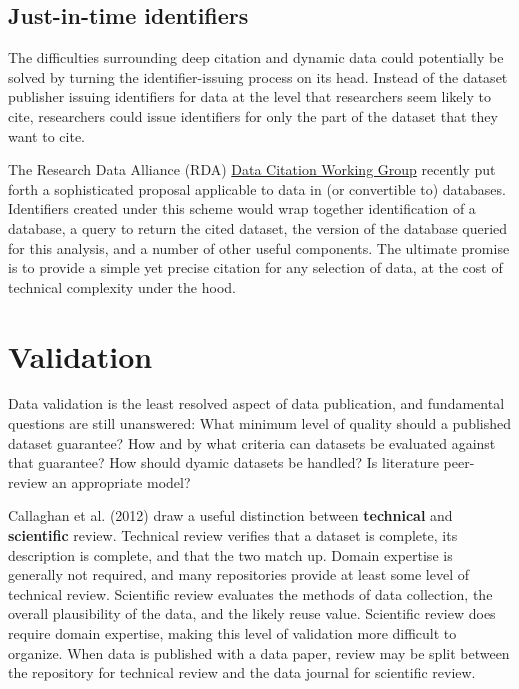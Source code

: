 \documentclass[10pt,a4paper,twocolumn]{article}
\begin{document}
{\subsection*{Just-in-time identifiers}\label{just-in-time-identifiers}

The difficulties surrounding deep citation and dynamic data could potentially be solved by turning the identifier-issuing process on its head.
Instead of the dataset publisher issuing identifiers for data at the level that researchers seem likely to cite, researchers could issue identifiers for only the part of the dataset that they want to cite.

The Research Data Alliance (RDA) \href{http://rd-alliance.org/working-groups/data-citation-wg.html}{Data Citation Working Group} recently put forth a sophisticated proposal applicable to data in (or convertible to) databases.
Identifiers created under this scheme would wrap together identification of a database, a query to return the cited dataset, the version of the database queried for this analysis, and a number of other useful components.
The ultimate promise is to provide a simple yet precise citation for any selection of data, at the cost of technical complexity under the hood.

\section*{Validation}\label{validation}

Data validation is the least resolved aspect of data publication, and fundamental questions are still unanswered:
What minimum level of quality should a published dataset guarantee?
How and by what criteria can datasets be evaluated against that guarantee?
How should dyamic datasets be handled?
Is literature peer-review an appropriate model?

Callaghan et al. (2012)\cite{sarah_callaghan_making_2012} draw a useful distinction between \textbf{technical} and \textbf{scientific} review.
Technical review verifies that a dataset is complete, its description is complete, and that the two match up.
Domain expertise is generally not required, and many repositories provide at least some level of technical review.
Scientific review evaluates the methods of data collection, the overall plausibility of the data, and the likely reuse value.
Scientific review does require domain expertise, making this level of validation more difficult to organize\cite{doorn_lies_2013}.
When data is published with a data paper, review may be split between the repository for technical review and the data journal for scientific review.

}
\end{document}
